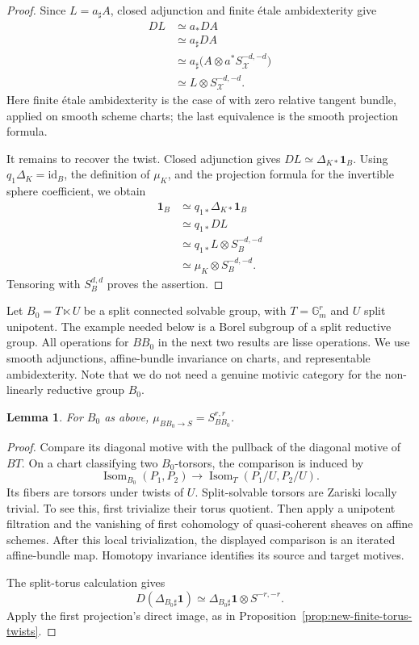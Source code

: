\documentclass[11pt,reqno]{amsart}
\newtheorem{lemma}[theorem]{Lemma}
\theoremstyle{definition}
\theoremstyle{remark}
\theoremstyle{plain}
\numberwithin{equation}{section}
\newcommand{\one}{\mathbf 1}
\newcommand{\Gm}{\mathbb G_m}
\begin{document}
\begin{proof}
Since \(L=a_\sharp A\), closed adjunction and finite
\'etale ambidexterity give
\[
 \begin{aligned}
 DL
 &\simeq a_*DA\\
 &\simeq a_\sharp DA\\
 &\simeq a_\sharp
       \bigl(A\otimes a^*S^{-d,-d}_{\mathcal X}\bigr)\\
 &\simeq L\otimes S^{-d,-d}_{\mathcal X}.
 \end{aligned}
\]
Here finite \'etale ambidexterity is the case of
\cite[Theorem~6.9]{Hoyois} with zero relative tangent bundle,
applied on smooth scheme charts; the last equivalence is
the smooth projection formula.

It remains to recover the twist.
Closed adjunction gives \(DL\simeq\Delta_{K*}\one_B\).
Using \(q_1\Delta_K=\mathrm{id}_B\), the definition of
\(\mu_K\), and the projection formula for the invertible
sphere coefficient, we obtain
\[
 \begin{aligned}
 \one_B
 &\simeq q_{1*}\Delta_{K*}\one_B\\
 &\simeq q_{1*}DL\\
 &\simeq q_{1*}L\otimes S^{-d,-d}_B\\
 &\simeq \mu_K\otimes S^{-d,-d}_B.
 \end{aligned}
\]
Tensoring with \(S^{d,d}_B\) proves the assertion.
\end{proof}


Let \(B_0=T\ltimes U\) be a split connected solvable group, with \(T=\Gm^r\) and \(U\) split unipotent.
The example needed below is a Borel subgroup of a split reductive group.
All operations for \(BB_0\) in the next two results are lisse operations.
We use smooth adjunctions, affine-bundle invariance on charts, and
representable ambidexterity.
Note that we do not need a genuine motivic category for the non-linearly reductive
group \(B_0\).

\begin{lemma}\label{lem:new-borel-twist}
For \(B_0\) as above, \(\mu_{BB_0\to S}=S^{r,r}_{BB_0}\).
\end{lemma}
\begin{proof}
Compare its diagonal motive with the pullback of the diagonal motive of \(BT\).
On a chart classifying two \(B_0\)-torsors, the comparison is induced by
\[
 \operatorname{Isom}_{B_0}(P_1,P_2)
 \longrightarrow
 \operatorname{Isom}_T(P_1/U,P_2/U).
\]
Its fibers are torsors under twists of \(U\).
Split-solvable torsors are Zariski locally trivial.
To see this, first trivialize their torus quotient.
Then apply a unipotent filtration and the vanishing of first cohomology of quasi-coherent sheaves on affine schemes.
After this local trivialization, the displayed comparison is an iterated affine-bundle map.
Homotopy invariance identifies its source and target motives.

The split-torus calculation gives
\[
 D(\Delta_{B_0\sharp}\one)
 \simeq\Delta_{B_0\sharp}\one\otimes S^{-r,-r}.
\]
Apply the first projection's direct image, as in Proposition~\ref{prop:new-finite-torus-twists}.
\end{proof}
\end{document}
